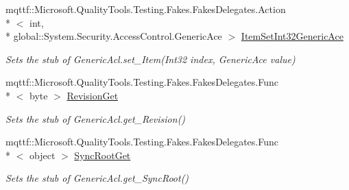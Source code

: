 \begin{DoxyCompactItemize}
mqttf\-::\-Microsoft.\-Quality\-Tools.\-Testing.\-Fakes.\-Fakes\-Delegates.\-Action\\*
$<$ int, \\*
global\-::\-System.\-Security.\-Access\-Control.\-Generic\-Ace $>$ \hyperlink{class_system_1_1_security_1_1_access_control_1_1_fakes_1_1_stub_generic_acl_a8a1f0f2adbcc65be0fc3436debfb7c8d}{Item\-Set\-Int32\-Generic\-Ace}
\begin{DoxyCompactList}\small\item\em Sets the stub of Generic\-Acl.\-set\-\_\-\-Item(\-Int32 index, Generic\-Ace value)\end{DoxyCompactList}\item 
mqttf\-::\-Microsoft.\-Quality\-Tools.\-Testing.\-Fakes.\-Fakes\-Delegates.\-Func\\*
$<$ byte $>$ \hyperlink{class_system_1_1_security_1_1_access_control_1_1_fakes_1_1_stub_generic_acl_a4bfd5d31e18ac4aecc70cbeb256b1928}{Revision\-Get}
\begin{DoxyCompactList}\small\item\em Sets the stub of Generic\-Acl.\-get\-\_\-\-Revision()\end{DoxyCompactList}\item 
mqttf\-::\-Microsoft.\-Quality\-Tools.\-Testing.\-Fakes.\-Fakes\-Delegates.\-Func\\*
$<$ object $>$ \hyperlink{class_system_1_1_security_1_1_access_control_1_1_fakes_1_1_stub_generic_acl_a9f63698f1d1112d5a938567199a155b6}{Sync\-Root\-Get}
\begin{DoxyCompactList}\small\item\em Sets the stub of Generic\-Acl.\-get\-\_\-\-Sync\-Root()\end{DoxyCompactList}\end{DoxyCompactItemize}
